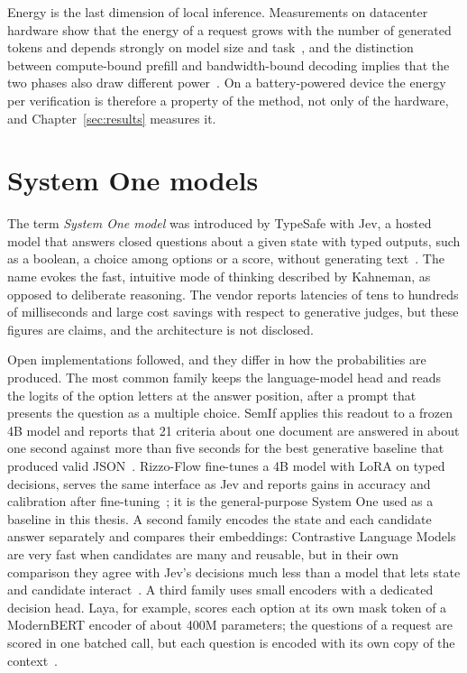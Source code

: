 Energy is the last dimension of local inference. Measurements on datacenter hardware show that the energy of a request
grows with the number of generated tokens and depends strongly on model size and task~\cite{samsi2023words,luccioni2024power},
and the distinction between compute-bound prefill and bandwidth-bound decoding implies that the two phases also draw
different power~\cite{patel2024splitwise}. On a battery-powered device the energy per verification is therefore a
property of the method, not only of the hardware, and Chapter~\ref{sec:results} measures it.

\section{System One models}
\label{sec:bg-systemone}

The term \emph{System One model} was introduced by TypeSafe with Jev, a hosted model that answers closed questions about
a given state with typed outputs, such as a boolean, a choice among options or a score, without generating
text~\cite{typesafe2026jev}. The name evokes the fast, intuitive mode of thinking described by Kahneman, as opposed to
deliberate reasoning. The vendor reports latencies of tens to hundreds of milliseconds and large cost savings with
respect to generative judges, but these figures are claims, and the architecture is not disclosed.

Open implementations followed, and they differ in how the probabilities are produced. The most common family keeps the
language-model head and reads the logits of the option letters at the answer position, after a prompt that presents the
question as a multiple choice. SemIf applies this readout to a frozen 4B model and reports that 21 criteria about one
document are answered in about one second against more than five seconds for the best generative baseline that produced
valid JSON~\cite{semif}. Rizzo-Flow fine-tunes a 4B model with LoRA on typed decisions, serves the same interface as Jev
and reports gains in accuracy and calibration after fine-tuning~\cite{rizzoflow}; it is the general-purpose System One
used as a baseline in this thesis. A second family encodes the state and each candidate answer separately and compares
their embeddings: Contrastive Language Models are very fast when candidates are many and reusable, but in their own
comparison they agree with Jev's decisions much less than a model that lets state and candidate interact~\cite{kwok2026clm}.
A third family uses small encoders with a dedicated decision head. Laya, for example, scores each option at its own mask
token of a ModernBERT encoder of about 400M parameters; the questions of a request are scored in one batched call, but
each question is encoded with its own copy of the context~\cite{convai2026laya,azizi2026labels}.

